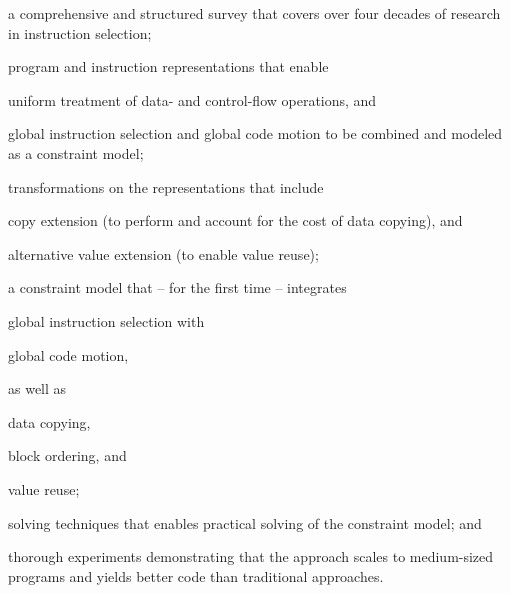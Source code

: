 \begin{contributions}
\item {}
    a comprehensive and structured survey that covers over four decades of
    research in instruction selection;
  \item {}
    program and instruction representations that enable
    \begin{contributions}
      \item uniform treatment of data- and control-flow operations, and
      \item global instruction selection and global code motion to be combined
        and modeled as a constraint model;
    \end{contributions}
  \item {}
    transformations on the representations that include
    \begin{contributions}
      \item {}
        copy extension (to perform and account for the cost of data copying),
        and
      \item {}
        alternative value extension (to enable value reuse);
    \end{contributions}
  \item {}
    a constraint model that -- for the first time -- integrates
    \begin{contributions}
      \item {}
        global instruction selection with
      \item {}
        global code motion,
    \end{contributions}
    as well as
    \begin{contributions}[resume]
      \item {}
        data copying,
      \item {}
        block ordering, and
      \item {}
        value reuse;
    \end{contributions}
  \item {}
    solving techniques that enables practical solving of the constraint model;
    and
  \item {}
    thorough experiments demonstrating that the approach scales to medium-sized
    programs and yields better code than traditional approaches.
\end{contributions}

